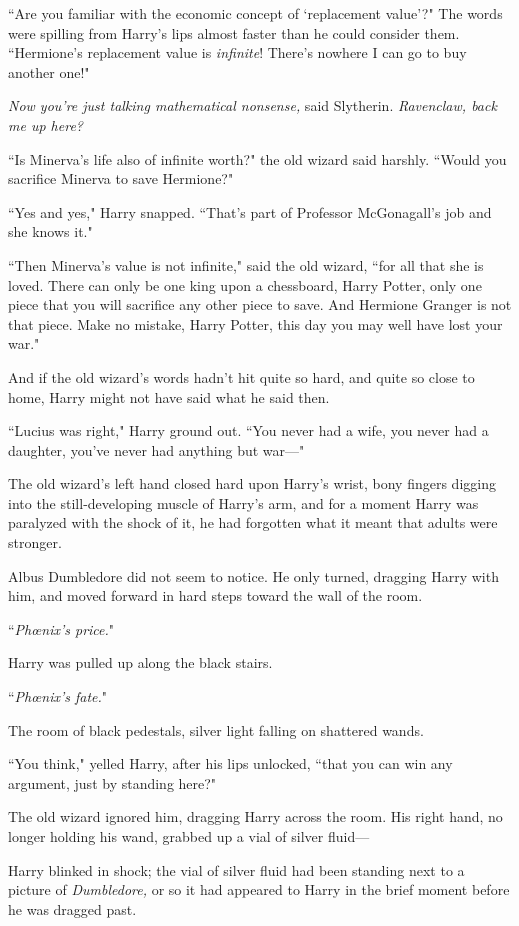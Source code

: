 ``Are you familiar with the economic concept of `replacement value'?" The words were spilling from Harry's lips almost faster than he could consider them. ``Hermione's replacement value is \emph{infinite}! There's nowhere I can go to buy another one!"

\emph{Now you're just talking mathematical nonsense,} said Slytherin. \emph{Ravenclaw, back me up here?}

``Is Minerva's life also of infinite worth?" the old wizard said harshly. ``Would you sacrifice Minerva to save Hermione?"

``Yes and yes," Harry snapped. ``That's part of Professor McGonagall's job and she knows it."

``Then Minerva's value is not infinite," said the old wizard, ``for all that she is loved. There can only be one king upon a chessboard, Harry Potter, only one piece that you will sacrifice any other piece to save. And Hermione Granger is not that piece. Make no mistake, Harry Potter, this day you may well have lost your war."

And if the old wizard's words hadn't hit quite so hard, and quite so close to home, Harry might not have said what he said then.

``Lucius was right," Harry ground out. ``You never had a wife, you never had a daughter, you've never had anything but war—"

The old wizard's left hand closed hard upon Harry's wrist, bony fingers digging into the still-developing muscle of Harry's arm, and for a moment Harry was paralyzed with the shock of it, he had forgotten what it meant that adults were stronger.

Albus Dumbledore did not seem to notice. He only turned, dragging Harry with him, and moved forward in hard steps toward the wall of the room.

``\emph{Phœnix's price.}"

Harry was pulled up along the black stairs.

``\emph{Phœnix's fate.}"

The room of black pedestals, silver light falling on shattered wands.

``You think," yelled Harry, after his lips unlocked, ``that you can win any argument, just by standing here?"

The old wizard ignored him, dragging Harry across the room. His right hand, no longer holding his wand, grabbed up a vial of silver fluid—

Harry blinked in shock; the vial of silver fluid had been standing next to a picture of \emph{Dumbledore,} or so it had appeared to Harry in the brief moment before he was dragged past.

